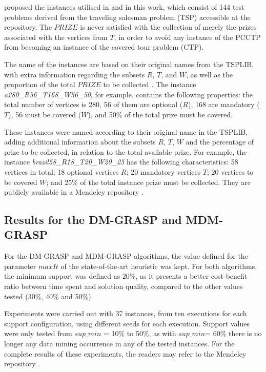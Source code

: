 \documentclass{singlecol-new}
\begin{document}
\citet{silva2009problema} proposed the instances utilised in \citet{daSilva} and in this work, which consist of 144 test problems derived from the traveling salesman problem (TSP) accessible at the \citet{reinelt1991tsplib} repository.  The $PRIZE$ is never satisfied with the collection of merely the prizes associated with the vertices from $T$, in order to avoid any instance of the PCCTP from becoming an instance of the covered tour problem (CTP).

The name of the instances are based on their original names from the TSPLIB, with extra information regarding the subsets $R$, $T$, and $W$, as well as the proportion of the total $PRIZE$ to be collected \cite{silva2009problema}. The instance \textit{a280\_R56\_T168\_W56\_50}, for example, contains the following properties: the total number of vertices is 280,  56 of them are optional ($R$), 168 are mandatory ($T$), 56 must be covered ($W$), and 50\% of the total prize must be covered. 

These instances were named according to their original name in the TSPLIB, adding additional information about the subsets $R$, $T$, $W$ and the percentage of prize to be collected, in relation to the total available prize. For example, the instance \textit{brazil58\_R18\_T20\_W20\_25} has the following characteristics: 58 vertices in total; 18 optional vertices $R$; 20 mandatory vertices $T$; 20 vertices to be covered $W$; and 25\% of the total instance prize must be collected. They are publicly available in a  Mendeley repository \citep{pcctspMendely}.

\subsection{Results for the DM-GRASP and MDM-GRASP}

For the DM-GRASP and MDM-GRASP algorithms, the value defined for the parameter $maxIt$ of the state-of-the-art heuristic was kept. For both algorithms, the minimum support was defined as 20\%, as it presents a better cost-benefit ratio between time spent and solution quality, compared to the other values tested (30\%, 40\% and 50\%).

Experiments were carried out with 37 instances, from ten executions for each support configuration, using different seeds for each execution. Support values were only tested from $sup\_min$ = 10\% to 50\%, as with $sup\_min$= 60\% there is no longer any data mining occurrence in any of the tested instances. For the complete results of these experiments, the readers may refer to the Mendeley repository \cite{pcctspMendely}.
\end{document}
